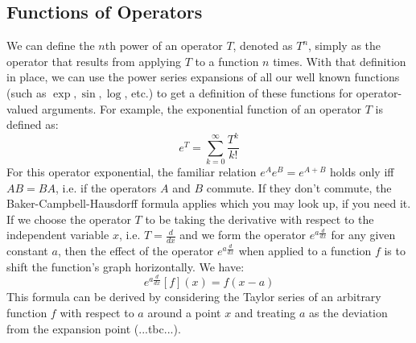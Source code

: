 \subsection{Functions of Operators}
We can define the $n$th power of an operator $T$, denoted as $T^n$, simply as the operator that results from applying $T$ to a function $n$ times. With that definition in place, we can use the power series expansions of all our well known functions (such as $\exp, \sin, \log$, etc.) to get a definition of these functions for operator-valued arguments. For example, the exponential function of an operator $T$ is defined as:
\begin{equation}
  e^T = \sum_{k=0}^{\infty} \frac{T^k}{k!}
\end{equation}
For this operator exponential, the familiar relation $e^A e^B = e^{A + B}$ holds only iff $A B = B A$, i.e. if the operators $A$ and $B$ commute. If they don't commute, the Baker-Campbell-Hausdorff formula applies which you may look up, if you need it. If we choose the operator $T$ to be taking the derivative with respect to the independent variable $x$, i.e. $T = \frac{d}{dx}$ and we form the operator $e^{a \frac{d}{dx}}$ for any given constant $a$, then the effect of the operator $e^{a \frac{d}{dx}}$ when applied to a function $f$ is to shift the function's graph horizontally. We have: 
\begin{equation}
  e^{a \frac{d}{dx}} [f] (x) = f(x-a)
\end{equation}
This formula can be derived by considering the Taylor series of an arbitrary function $f$ with respect to $a$ around a point $x$ and treating $a$ as the deviation from the expansion point (...tbc...).




